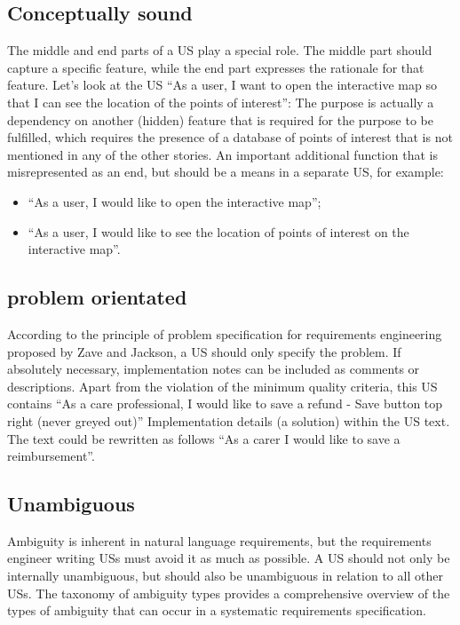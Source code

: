 \subsection*{\normalsize{Conceptually sound}}
The middle and end parts of a US play a special role. The middle part should capture a specific feature, while the end part expresses the rationale for that feature. Let's look at the US \enquote{As a user, I want to open the interactive map so that I can see the location of the points of interest}: The purpose is actually a dependency on another (hidden) feature that is required for the purpose to be fulfilled, which requires the presence of a database of points of interest that is not mentioned in any of the other stories. An important additional function that is misrepresented as an end, but should be a means in a separate US, for example:
\begin{itemize}
\item \enquote{As a user, I would like to open the interactive map};
\item \enquote{As a user, I would like to see the location of points of interest on the interactive map}.
\end{itemize}
\subsection*{\normalsize{problem orientated}}
According to the principle of problem specification for requirements engineering proposed by Zave and Jackson, a US should only specify the problem. If absolutely necessary, implementation notes can be included as comments or descriptions. Apart from the violation of the minimum quality criteria, this US contains \enquote{As a care professional, I would like to save a refund - Save button top right (never greyed out)} Implementation details (a solution) within the US text. The text could be rewritten as follows \enquote{As a carer I would like to save a reimbursement}.
\subsection*{\normalsize{Unambiguous}}
Ambiguity is inherent in natural language requirements, but the requirements engineer writing USs must avoid it as much as possible. A US should not only be internally unambiguous, but should also be unambiguous in relation to all other USs. The taxonomy of ambiguity types \cite{berry2004ambiguity} provides a comprehensive overview of the types of ambiguity that can occur in a systematic requirements specification.

